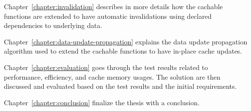 Chapter~\ref{chapter:invalidation} describes in more details how the cachable functions are extended to have automatic invalidations using declared dependencies to underlying data.

Chapter~\ref{chapter:data-update-propagation} explains the data update propagation algorithm used to extend the cachable functions to have in-place cache updates.

Chapter~\ref{chapter:evaluation} goes through the test results related to performance, efficiency, and cache memory usages. The solution are then discussed and evaluated based on the test results and the initial requirements.

Chapter~\ref{chapter:conclusion} finalize the thesis with a conclusion.




